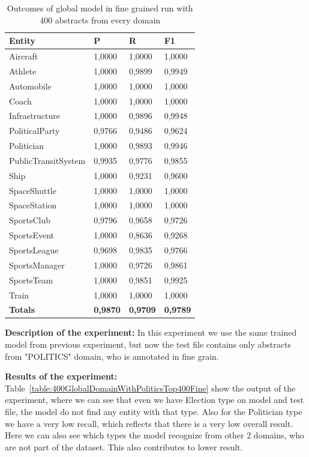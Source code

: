\documentclass[thesis=M,english]{FITthesis}[2018/05/30]
\begin{document}
	\begin{table}[H]\centering
		\begin{tabular}{|l|l|l|l|}
			\hline {\textbf{Entity}} & {\textbf{P}} & {\textbf{R}} & {\textbf{F1}}\\\hline
				Aircraft & 1,0000 & 1,0000 & 1,0000\\
				Athlete & 1,0000 & 0,9899 & 0,9949\\
				Automobile & 1,0000 & 1,0000 & 1,0000\\ 
				Coach & 1,0000 & 1,0000 & 1,0000\\
				Infrastructure & 1,0000 & 0,9896 & 0,9948\\
				PoliticalParty & 0,9766 & 0,9486 & 0,9624\\
				Politician & 1,0000 & 0,9893 & 0,9946\\
				PublicTransitSystem & 0,9935 & 0,9776 & 0,9855\\
				Ship & 1,0000 & 0,9231 & 0,9600\\
				SpaceShuttle & 1,0000 & 1,0000 & 1,0000\\
				SpaceStation & 1,0000 & 1,0000 & 1,0000\\ 
				SportsClub & 0,9796 & 0,9658 & 0,9726\\
				SportsEvent & 1,0000 & 0,8636 & 0,9268\\
				SportsLeague & 0,9698 & 0,9835 & 0,9766\\
				SportsManager & 1,0000 & 0,9726 & 0,9861\\
				SportsTeam & 1,0000 & 0,9851 & 0,9925\\
				Train & 1,0000 & 1,0000 & 1,0000\\\hline
				\textbf{Totals} & \textbf{0,9870} & \textbf{0,9709} & \textbf{0,9789}\\\hline
		\end{tabular}
		\caption{Outcomes of global model in fine grained run with 400 abstracts from every domain \label{table:400GlobalDomainWithAllAbstractsTop400Fine}}
	\end{table}

\textbf{Description of the experiment:} In this experiment we use the same trained model from previous experiment, but now the test file contains only abstracts from "POLITICS" domain, who is annotated in fine grain.

\textbf{Results of the experiment:} Table~\ref{table:400GlobalDomainWithPoliticsTop400Fine} show the output of the experiment, where we can see that even we have Election type on model and test file, the model do not find any entity with that type. Also for the Politician type we have a very low recall, which reflects that there is a very low overall result. Here we can also see which types the model recognize from other 2 domains, who are not part of the dataset. This also contributes to lower result.
\end{document}
